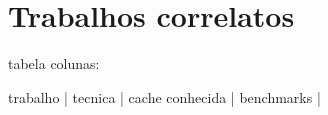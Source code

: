 \chapter{Trabalhos correlatos}
\label{cap:trabalhos_correlatos}




tabela colunas:

trabalho | tecnica | cache conhecida | benchmarks |
